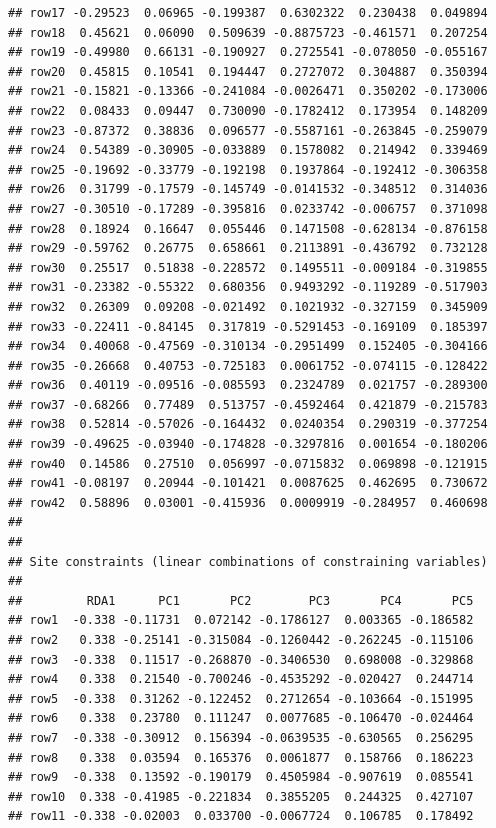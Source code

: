 \documentclass[
]{article}
\begin{document}
\begin{verbatim}
## row17 -0.29523  0.06965 -0.199387  0.6302322  0.230438  0.049894
## row18  0.45621  0.06090  0.509639 -0.8875723 -0.461571  0.207254
## row19 -0.49980  0.66131 -0.190927  0.2725541 -0.078050 -0.055167
## row20  0.45815  0.10541  0.194447  0.2727072  0.304887  0.350394
## row21 -0.15821 -0.13366 -0.241084 -0.0026471  0.350202 -0.173006
## row22  0.08433  0.09447  0.730090 -0.1782412  0.173954  0.148209
## row23 -0.87372  0.38836  0.096577 -0.5587161 -0.263845 -0.259079
## row24  0.54389 -0.30905 -0.033889  0.1578082  0.214942  0.339469
## row25 -0.19692 -0.33779 -0.192198  0.1937864 -0.192412 -0.306358
## row26  0.31799 -0.17579 -0.145749 -0.0141532 -0.348512  0.314036
## row27 -0.30510 -0.17289 -0.395816  0.0233742 -0.006757  0.371098
## row28  0.18924  0.16647  0.055446  0.1471508 -0.628134 -0.876158
## row29 -0.59762  0.26775  0.658661  0.2113891 -0.436792  0.732128
## row30  0.25517  0.51838 -0.228572  0.1495511 -0.009184 -0.319855
## row31 -0.23382 -0.55322  0.680356  0.9493292 -0.119289 -0.517903
## row32  0.26309  0.09208 -0.021492  0.1021932 -0.327159  0.345909
## row33 -0.22411 -0.84145  0.317819 -0.5291453 -0.169109  0.185397
## row34  0.40068 -0.47569 -0.310134 -0.2951499  0.152405 -0.304166
## row35 -0.26668  0.40753 -0.725183  0.0061752 -0.074115 -0.128422
## row36  0.40119 -0.09516 -0.085593  0.2324789  0.021757 -0.289300
## row37 -0.68266  0.77489  0.513757 -0.4592464  0.421879 -0.215783
## row38  0.52814 -0.57026 -0.164432  0.0240354  0.290319 -0.377254
## row39 -0.49625 -0.03940 -0.174828 -0.3297816  0.001654 -0.180206
## row40  0.14586  0.27510  0.056997 -0.0715832  0.069898 -0.121915
## row41 -0.08197  0.20944 -0.101421  0.0087625  0.462695  0.730672
## row42  0.58896  0.03001 -0.415936  0.0009919 -0.284957  0.460698
## 
## 
## Site constraints (linear combinations of constraining variables)
## 
##         RDA1      PC1       PC2        PC3       PC4       PC5
## row1  -0.338 -0.11731  0.072142 -0.1786127  0.003365 -0.186582
## row2   0.338 -0.25141 -0.315084 -0.1260442 -0.262245 -0.115106
## row3  -0.338  0.11517 -0.268870 -0.3406530  0.698008 -0.329868
## row4   0.338  0.21540 -0.700246 -0.4535292 -0.020427  0.244714
## row5  -0.338  0.31262 -0.122452  0.2712654 -0.103664 -0.151995
## row6   0.338  0.23780  0.111247  0.0077685 -0.106470 -0.024464
## row7  -0.338 -0.30912  0.156394 -0.0639535 -0.630565  0.256295
## row8   0.338  0.03594  0.165376  0.0061877  0.158766  0.186223
## row9  -0.338  0.13592 -0.190179  0.4505984 -0.907619  0.085541
## row10  0.338 -0.41985 -0.221834  0.3855205  0.244325  0.427107
## row11 -0.338 -0.02003  0.033700 -0.0067724  0.106785  0.178492

\end{verbatim}
\end{document}
